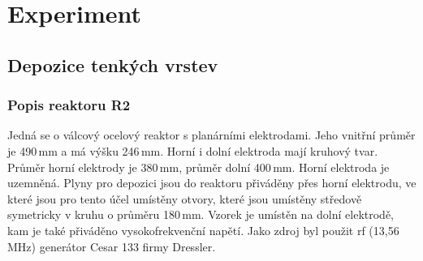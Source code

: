 \documentclass[12pt,oneside,final]{fithesis2}
\begin{document}
%
%
%
%
%
%
%
%
%


\chapter{Experiment}



\section{Depozice tenkých vrstev}
\subsection{Popis reaktoru R2}
Jedná se o válcový ocelový reaktor s planárními elektrodami. Jeho vnitřní průměr je 490\,mm a má výšku 246\,mm. Horní i dolní elektroda mají kruhový tvar. Průměr horní elektrody je 380\,mm, průměr dolní 400\,mm. Horní elektroda je uzemněná. Plyny pro depozici jsou do reaktoru přiváděny přes horní elektrodu, ve které jsou pro tento účel umístěny otvory, které jsou umístěny středově symetricky v kru\-hu o průměru 180\,mm. Vzorek je umístěn na dolní elektrodě, kam je také přiváděno vysokofrekvenční napětí. Jako zdroj byl použit rf (13,56\,MHz) generátor Cesar 133 firmy Dressler.
\end{document}
